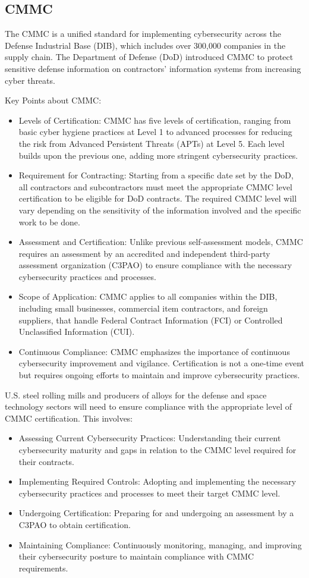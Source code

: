 \documentclass{tufte-handout}
\begin{document}
\subsection{CMMC}\label{sec:headings}
The CMMC is a unified standard for implementing cybersecurity across the Defense Industrial Base (DIB), which includes over 300,000 companies in the supply chain.
The Department of Defense (DoD) introduced CMMC to protect sensitive defense information on contractors' information systems from increasing cyber threats.

Key Points about CMMC:
\begin{itemize}
\item Levels of Certification: CMMC has five levels of certification, ranging from basic cyber hygiene practices at Level 1 to advanced processes for reducing the risk from
Advanced Persistent Threats (APTs) at Level 5. Each level builds upon the previous one, adding more stringent cybersecurity practices.
\item Requirement for Contracting: Starting from a specific date set by the DoD, all contractors and subcontractors must meet the appropriate CMMC level certification to be
eligible for DoD contracts. The required CMMC level will vary depending on the sensitivity of the information involved and the specific work to be done.
\item Assessment and Certification: Unlike previous self-assessment models, CMMC requires an assessment by an accredited and independent third-party assessment organization
(C3PAO) to ensure compliance with the necessary cybersecurity practices and processes.
\item Scope of Application: CMMC applies to all companies within the DIB, including small businesses, commercial item contractors, and foreign suppliers, that handle Federal
Contract Information (FCI) or Controlled Unclassified Information (CUI).
\item Continuous Compliance: CMMC emphasizes the importance of continuous cybersecurity improvement and vigilance. Certification is not a one-time event but requires ongoing
efforts to maintain and improve cybersecurity practices.
\end{itemize}

U.S. steel rolling mills and producers of alloys for the defense and space technology sectors will need to ensure compliance with the appropriate level of CMMC certification.
This involves:
\begin{itemize}
\item Assessing Current Cybersecurity Practices: Understanding their current cybersecurity maturity and gaps in relation to the CMMC level required for their contracts.
\item Implementing Required Controls: Adopting and implementing the necessary cybersecurity practices and processes to meet their target CMMC level.
\item Undergoing Certification: Preparing for and undergoing an assessment by a C3PAO to obtain certification.
\item Maintaining Compliance: Continuously monitoring, managing, and improving their cybersecurity posture to maintain compliance with CMMC requirements.
\end{itemize}
\end{document}
